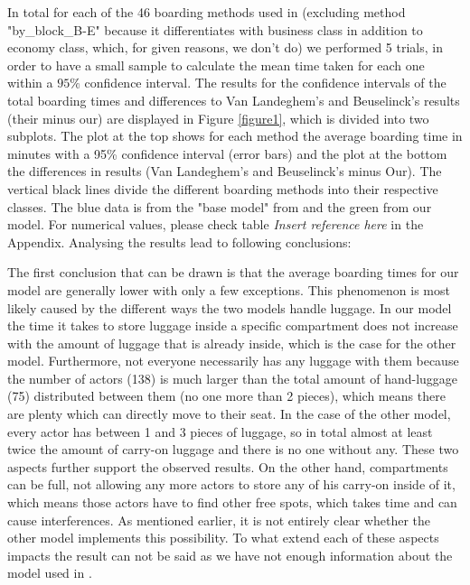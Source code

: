 \documentclass[11pt]{article}
\begin{document}
In total for each of the 46 boarding methods used in \cite{beus}(excluding method "by\_block\_B-E" because it differentiates with business class in addition to economy class, which, for given reasons, we don't do) we performed 5 trials, in order to have a small sample to calculate the mean time taken for each one within a $95\%$ confidence interval.
The results for the confidence intervals of the total boarding times and differences to Van Landeghem's and Beuselinck's results (their minus our) are displayed in Figure \ref{figure1}, which is divided into two subplots. The plot at the top shows for each method the average boarding time in minutes with a 95\% confidence interval (error bars) and the plot at the bottom the differences in results (Van Landeghem's and Beuselinck's minus Our). The vertical black lines divide the different boarding methods into their respective classes. The blue data is from the "base model" from \cite{beus} and the green from our model. For numerical values, please check table \textit{Insert reference here} in the Appendix. 
Analysing the results lead to following conclusions:


The first conclusion that can be drawn is that the average boarding times for our model are generally lower with only a few exceptions. This phenomenon is most likely caused by the different ways the two models handle luggage. In our model the time it takes to store luggage inside a specific compartment does not increase with the amount of luggage that is already inside, which is the case for the other model. Furthermore, not everyone necessarily has any luggage with them because the number of actors (138) is much larger than the total amount of hand-luggage (75) distributed between them (no one more than 2 pieces), which means there are plenty which can directly move to their seat. In the case of the other model, every actor has between 1 and 3 pieces of luggage, so in total almost at least twice the amount of carry-on luggage and there is no one without any. These two aspects further support the observed results. On the other hand, compartments can be full, not allowing any more actors to store any of his carry-on inside of it, which means those actors have to find other free spots, which takes time and can cause interferences.  As mentioned earlier, it is not entirely clear whether the other model implements this possibility. To what extend each of these aspects impacts the result can not be said as we have not enough information about the model used in \cite{beus}. 
	
\end{document}
